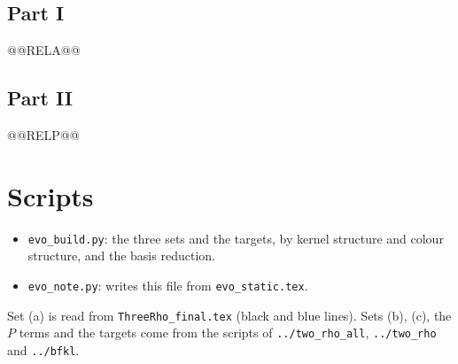 \documentclass[10pt]{article}
\numberwithin{equation}{section}
\begin{document}
\subsection{Part I}
@@RELA@@
\subsection{Part II}
@@RELP@@

\section{Scripts}
\begin{itemize}
\item \texttt{evo\_build.py}: the three sets and the targets, by kernel structure and colour structure, and the basis reduction.
\item \texttt{evo\_note.py}: writes this file from \texttt{evo\_static.tex}.
\end{itemize}
Set (a) is read from \texttt{ThreeRho\_final.tex} (black and blue lines). Sets (b), (c), the $P$ terms and the targets come from the scripts of \texttt{../two\_rho\_all}, \texttt{../two\_rho} and \texttt{../bfkl}.
\end{document}
